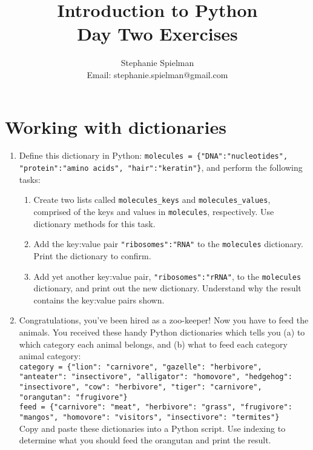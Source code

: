 \documentclass{article}[12pt]
\newcommand{\code}[1]{\texttt{#1}}  %
\begin{document}
\title{Introduction to Python \\ Day Two Exercises}
\author{Stephanie Spielman \\ \footnotesize{Email: stephanie.spielman@gmail.com}}
\date{}
\maketitle{}

\section{Working with dictionaries}

\begin{enumerate}[itemsep=5ex]
	
	\item Define this dictionary in Python: \code{molecules = \{"DNA":"nucleotides", "protein":"amino acids", "hair":"keratin"\}}, and perform the following tasks:
	\begin{enumerate}[itemsep=2ex]
		\item Create two lists called \code{molecules\_keys} and \code{molecules\_values}, comprised of the keys and values in \code{molecules}, respectively. Use dictionary methods for this task.
		\item Add the key:value pair \code{"ribosomes":"RNA"} to the \code{molecules} dictionary. Print the dictionary to confirm.
		\item Add yet another key:value pair, \code{"ribosomes":"rRNA"}, to the \code{molecules} dictionary, and print out the new dictionary. Understand why the result contains the key:value pairs shown.
	\end{enumerate}
	
	
	\item Congratulations, you've been hired as a zoo-keeper! Now you have to feed the animals. You received these handy Python dictionaries which tells you (a) to which category each animal belongs, and (b) what to feed each category animal category: \\
	
	\code{category = \{"lion": "carnivore", "gazelle": "herbivore", "anteater": "insectivore", "alligator": "homovore", "hedgehog": "insectivore", "cow": "herbivore", "tiger": "carnivore", "orangutan": "frugivore"\}} \\
	
	\code{feed = \{"carnivore": "meat", "herbivore": "grass", "frugivore": "mangos", "homovore": "visitors", "insectivore": "termites"\} } \\
	
	\noindent Copy and paste these dictionaries into a Python script. Use indexing to determine what you should feed the orangutan and print the result.
	

\end{enumerate}
\end{document}
